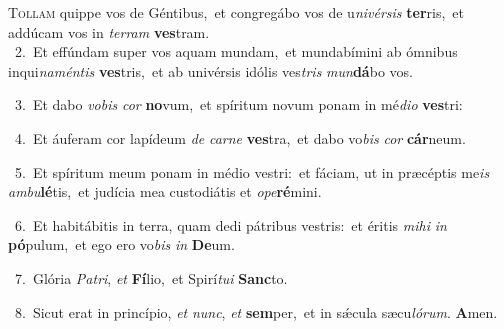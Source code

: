 \lettrine{\initial\textcolor{\initialcolor}{T}}{ollam} quippe vos de Géntibus,~\dagger et congregábo vos de u\-\textit{ni}\-\textit{vér}\textit{sis} \textbf{ter}\-ris,~\star et addúcam vos in \textit{ter}\-\textit{ram} \textbf{ves}\-tram.\\
{\numbfont\textcolor{\numbcolor}{~2.}}~Et effúndam super vos aquam mundam,~\dagger et mundabímini ab ómnibus inqui\-\textit{na}\-\textit{mén}\textit{tis} \textbf{ves}\-tris,~\star et ab univérsis idólis ves\textit{tris} \textit{mun}\-\textbf{dá}bo vos.\par
{\numbfont\textcolor{\numbcolor}{~3.}}~Et dabo \textit{vo}\-\textit{bis} \textit{cor} \textbf{no}\-vum,~\star et spíritum novum ponam in mé\-\textit{di}\-\textit{o} \textbf{ves}\-tri:\par
{\numbfont\textcolor{\numbcolor}{~4.}}~Et áuferam cor lapídeum \textit{de} \textit{car}\-\textit{ne} \textbf{ves}\-tra,~\star et dabo vo\textit{bis} \textit{cor} \textbf{cár}\-neum.\par
{\numbfont\textcolor{\numbcolor}{~5.}}~Et spíritum meum ponam in médio vestri:~\dagger et fáciam, ut in præcéptis me\textit{is} \textit{am}\-\textit{bu}\textbf{lé}tis,~\star et judícia mea custodiátis et \textit{o}\-\textit{pe}\textbf{ré}mini.\par
{\numbfont\textcolor{\numbcolor}{~6.}}~Et habitábitis in terra, quam dedi pátribus vestris:~\dagger et éritis \textit{mi}\-\textit{hi} \textit{in} \textbf{pó}\-pulum,~\star et ego ero vo\textit{bis} \textit{in} \textbf{De}\-um.\par
{\numbfont\textcolor{\numbcolor}{~7.}}~Glória \textit{Pa}\-\textit{tri}, \textit{et} \textbf{Fí}\-lio,~\star et Spirí\-\textit{tu}\-\textit{i} \textbf{Sanc}\-to.\par
{\numbfont\textcolor{\numbcolor}{~8.}}~Sicut erat in princípio, \textit{et} \textit{nunc}\-, \textit{et} \textbf{sem}\-per,~\star et in sǽcula sæcu\-\textit{ló}\-\textit{rum}. \textbf{A}\-men.\par
